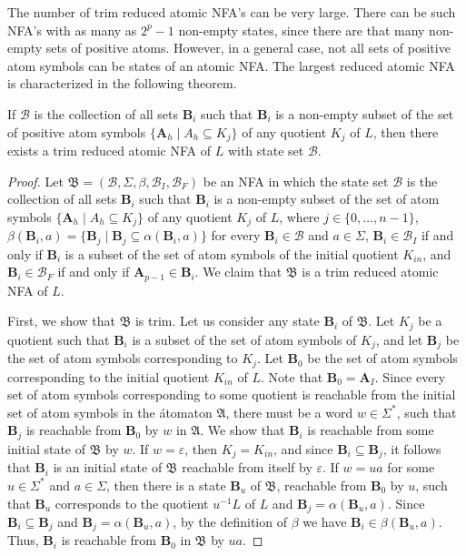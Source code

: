 \documentclass{llncs}
\newcommand{\eps}{\varepsilon}
\newcommand{\Sig}{\Sigma}
\newcommand{\bA}{{\mathbf A}}
\newcommand{\bmA}{\bm{A}}
\newcommand{\bmB}{\bm{B}}
\newcommand{\cB}{{\mathcal B}}
\newcommand{\fA}{{\mathfrak A}}
\newcommand{\fB}{{\mathfrak B}}
\begin{document}
The number of trim reduced atomic NFA's can be very large. 
There can be such NFA's with as many as $2^p-1$ non-empty states, 
since there are that many non-empty sets of positive atoms. 
However, in a general case, not all sets of positive atom symbols can be states of 
an atomic NFA. 
The largest reduced atomic NFA is characterized in the following theorem.

\begin{theorem}
\label{thm:subsets}
If $\cB$ is the collection of all sets $\bmB_i$ such that 
$\bmB_i$ is a non-empty subset of the set of positive atom symbols 
$\{\bA_h \mid A_h\subseteq K_j\}$ of any quotient $K_j$ of $L$, 
then there exists a trim reduced atomic NFA of $L$ with  state set $\cB$.
\end{theorem}
\begin{proof}
Let $\fB=(\cB,\Sig,\beta,\cB_I,\cB_F)$ be an NFA in which the state set 
$\cB$ is the collection of all sets $\bmB_i$ such that 
$\bmB_i$ is a non-empty subset of the set of atom symbols 
$\{\bA_h \mid A_h\subseteq K_j\}$ of any quotient $K_j$ of $L$, 
where $j\in\{0,\ldots,n-1\}$,
$\beta(\bmB_i,a)= \{\bmB_j \mid \bmB_j\subseteq\alpha(\bmB_i,a)\}$
for every $\bmB_i\in\cB$ and $a\in\Sig$,
$\bmB_i\in\cB_I$ if and only if $\bmB_i$ is a subset of the set of atom symbols 
of the initial quotient $K_{in}$, and 
$\bmB_i\in\cB_F$ if and only if $\bA_{p-1}\in\bmB_i$. 
We claim that $\fB$ is a trim reduced atomic NFA of $L$.

First, we show that $\fB$ is trim. 
Let us consider any state $\bmB_i$ of $\fB$.
Let $K_j$ be a quotient such that $\bmB_i$ is a subset of the set of atom symbols
of $K_j$, and let $\bmB_j$ be the set of atom symbols corresponding to $K_j$.
Let $\bmB_0$ be the set of atom symbols corresponding to the initial
quotient $K_{in}$ of $L$. Note that $\bmB_0=\bmA_I$.
Since every set of atom symbols corresponding to some quotient is reachable
from the initial set of atom symbols in the \'atomaton $\fA$, 
there must be a word $w\in\Sig^*$, such that $\bmB_j$ is reachable 
from $\bmB_0$ by $w$ in $\fA$. 
We show that $\bmB_i$ is reachable from some initial state of $\fB$ by $w$.
If $w=\eps$, then $K_j=K_{in}$, and since $\bmB_i\subseteq\bmB_j$, it follows 
that $\bmB_i$ is an initial state of $\fB$ reachable from itself 
by $\eps$.
If $w=ua$ for some $u\in\Sig^*$ and $a\in\Sig$, then there is a state
$\bmB_u$ of $\fB$, reachable from $\bmB_0$ by $u$, such that 
$\bmB_u$ corresponds to the quotient $u^{-1}L$ of $L$ and 
$\bmB_j=\alpha(\bmB_u,a)$. 
Since $\bmB_i\subseteq\bmB_j$ and $\bmB_j=\alpha(\bmB_u,a)$, 
by the definition of $\beta$ we have 
$\bmB_i\in\beta(\bmB_u,a)$. 
Thus, $\bmB_i$ is reachable from $\bmB_0$ in $\fB$ by $ua$.


\end{proof}
\end{document}
